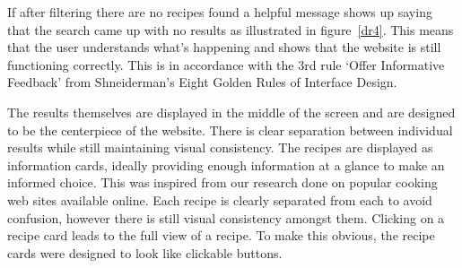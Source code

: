 If after filtering there are no recipes found a helpful message shows up saying that the search came up with no results as illustrated in figure~\ref{dr4}. This means that the user understands what’s happening and shows that the website is still functioning correctly. This is in accordance with the 3rd rule ‘Offer Informative Feedback’ from  Shneiderman’s Eight Golden Rules of Interface Design. 

The results themselves are displayed in the middle of the screen and are designed to be the centerpiece of the website. There is clear separation between individual results while still maintaining visual consistency. The recipes are displayed as information cards, ideally providing enough information at a glance to make an informed choice. This was inspired from our research done on popular cooking web sites available online. Each recipe is clearly separated from each to avoid confusion, however there is still visual consistency amongst them. Clicking on a recipe card leads to the full view of a recipe. To make this obvious, the recipe cards were designed to look like clickable buttons.